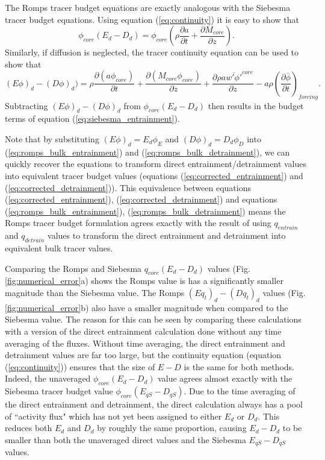 \documentclass[12pt]{article}
\begin{document}
The Romps tracer budget equations are exactly analogous with the Siebesma 
tracer budget equations.  Using equation (\ref{eq:continuity}) it is easy 
to show that
\begin{equation}
    \phi_{core}(E_d - D_d) =
    \phi_{core} \left(\rho \frac{\partial a}{\partial t}
                    + \frac{\partial M_{core}}{\partial z}\right).
\end{equation}
Similarly, if diffusion is neglected, the tracer continuity equation can be 
used to show that
\begin{equation}
    (E\phi)_d - (D\phi)_d) = 
     \rho \frac{\partial (a \phi_{core})}{\partial t}
   + \frac{\partial (M_{core} \phi_{core})}{\partial z}
   + \frac{\partial \rho a \overline{w' \phi'}^{core}}{\partial z}
   - a \rho \left(\frac{\partial \bar{\phi}}{\partial t}\right)_{forcing}.
\end{equation}
Subtracting $(E\phi)_d - (D\phi)_d$ from $\phi_{core}(E_d - D_d)$ then 
results in the budget terms of equation (\ref{eq:siebesma_entrainment}).

Note that by substituting $(E \phi)_d = E_d \phi_E$ and 
$(D\phi)_d = D_d \phi_D$ into (\ref{eq:romps_bulk_entrainment}) and 
(\ref{eq:romps_bulk_detrainment}), we can quickly recover the 
equations to transform direct entrainment/detrainment values into 
equivalent tracer budget values (equations (\ref{eq:corrected_entrainment}) 
and (\ref{eq:corrected_detrainment})).  This equivalence between equations 
(\ref{eq:corrected_entrainment}), (\ref{eq:corrected_detrainment}) and 
equations (\ref{eq:romps_bulk_entrainment}), (\ref{eq:romps_bulk_detrainment})
means the Romps tracer budget formulation agrees exactly with the result of 
using $q_{entrain}$ and $q_{detrain}$ values to transform the direct 
entrainment and detrainment into equivalent bulk tracer values.  

Comparing the Romps and Siebesma $q_{core}(E_d - D_d)$ values (Fig. \ref{fig:numerical_error}a) shows the Romps value is has a significantly smaller 
magnitude than the Siebesma value.  The Romps $(Eq_t)_d - (Dq_t)_d$ values
(Fig. \ref{fig:numerical_error}b) also have a smaller magnitude when 
compared to the Siebesma value.  The reason for this can be seen by 
comparing these calculations with a version of the direct entrainment 
calculation done without any time averaging of the fluxes.  Without time
averaging, the direct entrainment and detrainment values are far too large, 
but the continuity equation (equation (\ref{eq:continuity})) ensures that 
the size of $E-D$ is the same for both methods.  Indeed, the unaveraged 
$\phi_{core}(E_d - D_d)$ value agrees almost exactly with the Siebesma 
tracer budget value $\phi_{core}(E_{qS} - D_{qS})$.  Due to the time 
averaging of the direct entrainment and detrainment, the direct 
calculation always has a pool of ``activity flux" which has not yet been 
assigned to either $E_d$ or $D_d$.  This reduces both $E_d$ and $D_d$ by 
roughly the same proportion, causing $E_d-D_d$ to be smaller than both the 
unaveraged direct values and the Siebesma $E_{qS}-D_{qS}$ values.
\end{document}
